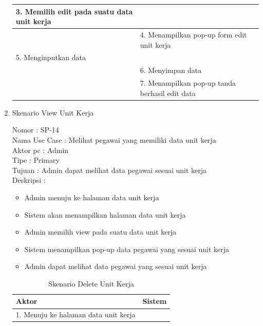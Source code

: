 \begin{enumerate}
\begin{table}
\begin{tabular}{ | p{58mm} | p{70mm} |}
		\hline
		
		3. Memilih edit pada suatu data unit kerja & \\
		
		\hline
		
		& 4.	Menampilkan pop-up form edit unit kerja \\
		
		\hline
		
		5.	Menginputkan data  & \\
		\hline
		
		& 6.	Menyimpan data \\
		\hline
		
		& 7.	Menampilkan pop-up tanda berhasil edit data \\
		\hline
		
	\end{tabular}
\end{table}

\newpage
\item Skenario View Unit Kerja

Nomor \kern 3.6pc : SP-14 \\
Nama Use Case : Melihat pegawai yang memiliki data unit kerja \\
Aktor  pc : Admin \\
Tipe \kern 4.6pc : Primary \\
Tujuan \kern 3.6pc : Admin dapat melihat data pegawai sesuai unit kerja \\
Deskripsi \kern 2.5pc : 

\begin{itemize}
	\item Admin menuju ke halaman data unit kerja
	\item Sistem akan menampilkan halaman data unit kerja
	\item Admin memilih view pada suatu data unit kerja
	\item Sistem menampilkan pop-up data pegawai yang sesuai unit kerja
	\item Admin dapat melihat data pegawai yang sesuai unit kerja
	
\end{itemize}

\begin{table}
	\caption{Skenario Delete Unit Kerja}
	\centering
	\begin{tabular}{ | p{63mm} | p{65mm} |}
		\hline 
		\textbf{Aktor} & \textbf{Sistem} \\
		\hline
		
		1.	Menuju ke halaman data unit kerja &  \\
		

\end{tabular}
\end{table}
\end{enumerate}
